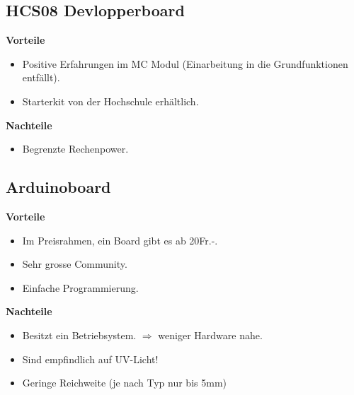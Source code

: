
\subsection{HCS08 Devlopperboard}
\textbf {Vorteile}
\begin{itemize}
\item Positive Erfahrungen im MC Modul (Einarbeitung in die Grundfunktionen entfällt).
\item Starterkit von der Hochschule erhältlich. \\
\end{itemize}
\textbf {Nachteile}
\begin{itemize}
\item Begrenzte Rechenpower.	
\end{itemize}

\subsection{Arduinoboard}
\textbf {Vorteile}
\begin{itemize}
\item Im Preisrahmen, ein Board gibt es ab 20Fr.-.
\item Sehr grosse Community.
\item Einfache Programmierung.\\
\end{itemize}
\textbf {Nachteile}
\begin{itemize}
\item Besitzt ein Betriebsystem. $\Rightarrow$ weniger Hardware nahe.
\item Sind empfindlich auf UV-Licht!
\item Geringe Reichweite (je nach Typ nur bis 5mm)
\end{itemize}

